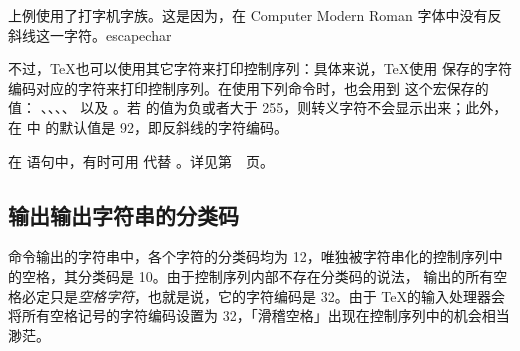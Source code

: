 \documentclass{book}
\begin{document}
上例使用了打字机字族。这是因为，在 Computer Modern Roman 字体中没有反斜线这一字符。\cstoidx escapechar\par 不过，\TeX 也可以使用其它字符来打印控制序列：具体来说，\TeX 使用  保存的字符编码对应的字符来打印控制序列。在使用下列命令时，也会用到  这个宏保存的值： 、、、、 以及 。若  的值为负或者大于 255，则转义字符不会显示出来；此外，在 \IniTeX 中  的默认值是 92，即反斜线的字符编码。

在  语句中，有时可用  代替 。详见第~\pageref{expand:write}~页。

\subsection{ 输出输出字符串的分类码}

 命令输出的字符串中，各个字符的分类码均为 12，唯独被字符串化的控制序列中的空格，其分类码是 10。由于控制序列内部不存在分类码的说法， 输出的所有空格必定只是\emph{空格字符}，也就是说，它的字符编码是 32。由于 \TeX 的输入处理器会将所有空格记号的字符编码设置为 32，「滑稽空格」出现在控制序列中的机会相当渺茫。
\end{document}
